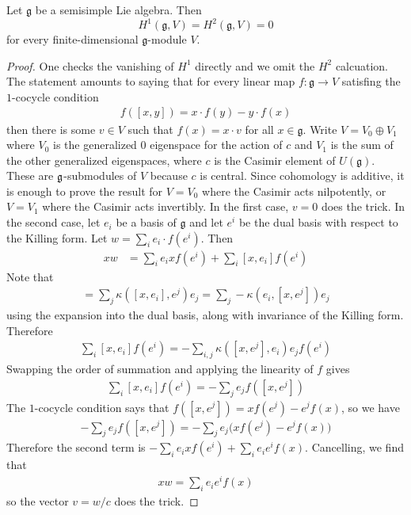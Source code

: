 \documentclass[12pt]{article}
\begin{document}
\begin{theorem}
    Let $\mathfrak g$ be a semisimple Lie algebra. Then \[H^1(\mathfrak g, V) = H^2(\mathfrak g, V) = 0\] for every finite-dimensional $\mathfrak g$-module $V$.
\end{theorem}
\begin{proof}
    One checks the vanishing of $H^1$ directly and we omit the $H^2$ calcuation. The statement amounts to saying that for every linear map $f : \mathfrak g \to V$ satisfing the $1$-cocycle condition \begin{align*}
        f([x,y]) = x \cdot f(y) - y \cdot f(x)
    \end{align*} then there is some $v \in V$ such that $f(x) = x \cdot v$ for all $x \in \mathfrak g$. Write $V = V_0 \oplus V_1$ where $V_0$ is the generalized $0$ eigenspace for the action of $c$ and $V_1$ is the sum of the other generalized eigenspaces, where $c$ is the Casimir element of $U(\mathfrak g)$. These are $\mathfrak{g}$-submodules of $V$ because $c$ is central. Since cohomology is additive, it is enough to prove the result for $V = V_0$ where the Casimir acts nilpotently, or $V = V_1$ where the Casimir acts invertibly. In the first case, $v=0$ does the trick. In the second case, let $e_i$ be a basis of $\mathfrak g$ and let $e^i$ be the dual basis with respect to the Killing form. Let $w = \sum_i e_i \cdot f(e^i)$. Then \begin{align*}
        xw & = \sum_i e_ix f(e^i) + \sum_i [x,e_i]f(e^i)
    \end{align*} Note that \begin{align*}
        [x,e_i] = \sum_j \kappa([x,e_i],e^j)e_j = \sum_j -\kappa(e_i,[x,e^j])e_j
    \end{align*} using the expansion into the dual basis, along with invariance of the Killing form. Therefore \begin{align*}
        \sum_i [x,e_i]f(e^i) = -\sum_{i,j} \kappa([x,e^j],e_i)e_j f(e^i)
    \end{align*}
    Swapping the order of summation and applying the linearity of $f$ gives \begin{align*}
        \sum_i [x,e_i]f(e^i) = -\sum_j e_j f([x,e^j])
    \end{align*} The $1$-cocycle condition says that $f([x,e^j]) = x f(e^j) - e^j f(x)$, so we have \begin{align*}
        -\sum_j e_j f([x,e^j])
        =
        -\sum_j e_j\bigl(x f(e^j)-e^j f(x)\bigr)
    \end{align*}
    Therefore the second term is $-\sum_i e_i x f(e^i)+\sum_i e_i e^i f(x)$. Cancelling, we find that \begin{align*}
        xw=\sum_i e_i e^i f(x)
    \end{align*} so the vector $v = w/c$ does the trick.
\end{proof}
\end{document}
